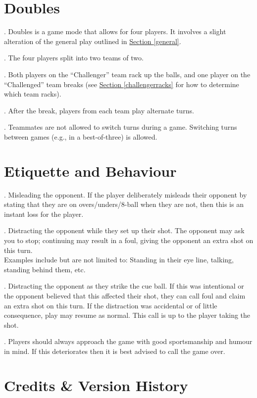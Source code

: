 \documentclass[a4paper, twocolumn]{article}
\def\PageTopMargin{2cm}
\def\PageLeftMargin{2cm}
\newcommand\atxy[3]{%
 \AddThispageHook{\smash{\hspace*{\dimexpr-\PageLeftMargin-\hoffset+#1\relax}%
  \raisebox{\dimexpr\PageTopMargin+\voffset-#2\relax}{#3}}}}
\newcommand{\itemspace}{\vspace{1.2mm}\\}
\newcommand{\placeframe}[1]{\atxy{-0.5cm}{29.1cm}{\texttt{[image: images/frame\#1]}}}
\begin{document}
\section{Doubles} \label{doubles}
\ex. Doubles is a game mode that allows for four players. It involves a slight alteration of the general play outlined in \hyperref[general]{Section \ref*{general}}.\par
\ex. The four players split into two teams of two.\par
\ex. Both players on the “Challenger” team rack up the balls, and one player on the “Challenged” team breaks (see \hyperref[challengerracks]{Section \ref*{challengerracks}} for how to determine which team racks).\par
\ex. After the break, players from each team play alternate turns.\par
\ex. Teammates are not allowed to switch turns during a game. Switching turns between games (e.g., in a best-of-three) is allowed.\par

\section{Etiquette and Behaviour} \label{etiquette}
\ex. \label{misleading}Misleading the opponent. If the player deliberately misleads their opponent by stating that they are on overs/unders/8-ball when they are not, then this is an instant loss for the player.\par
\ex. Distracting the opponent while they set up their shot. The opponent may ask you to stop; continuing may result in a foul, giving the opponent an extra shot on this turn.\itemspace Examples include but are not limited to: Standing in their eye line, talking, standing behind them, etc.\par
\ex. Distracting the opponent as they strike the cue ball. If this was intentional or the opponent believed that this affected their shot, they can call foul and claim an extra shot on this turn. If the distraction was accidental or of little consequence, play may resume as normal. This call is up to the player taking the shot.\par
\ex. \label{sportsmanship}Players should always approach the game with good sportsmanship and humour in mind. If this deteriorates then it is best advised to call the game over.\par

\placeframe{4}

\section{Credits \& Version History} \label{credits}
\end{document}
